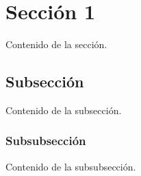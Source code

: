 \documentclass{article}
\begin{document}
\section{Sección 1}

Contenido de la sección.

\subsection{Subsección}

Contenido de la subsección.

\subsubsection{Subsubsección}

Contenido de la subsubsección.
\end{document}
